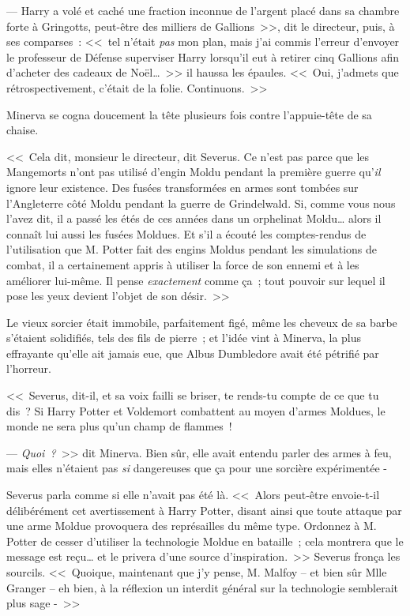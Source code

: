 --- Harry a volé et caché une fraction inconnue de l'argent placé dans sa chambre forte à Gringotts, peut-être des milliers de Gallions~>>, dit le directeur, puis, à ses comparses~: <<~tel n'était \emph{pas} mon plan, mais j'ai commis l'erreur d'envoyer le professeur de Défense superviser Harry lorsqu'il eut à retirer cinq Gallions afin d'acheter des cadeaux de Noël…~>> il haussa les épaules. <<~Oui, j'admets que rétrospectivement, c'était de la folie. Continuons.~>>

Minerva se cogna doucement la tête plusieurs fois contre l'appuie-tête de sa chaise.

<<~Cela dit, monsieur le directeur, dit Severus. Ce n'est pas parce que les Mangemorts n'ont pas utilisé d'engin Moldu pendant la première guerre qu'\emph{il} ignore leur existence. Des fusées transformées en armes sont tombées sur l'Angleterre côté Moldu pendant la guerre de Grindelwald. Si, comme vous nous l'avez dit, il a passé les étés de ces années dans un orphelinat Moldu… alors il connaît lui aussi les fusées Moldues. Et s'il a écouté les comptes-rendus de l'utilisation que M. Potter fait des engins Moldus pendant les simulations de combat, il a certainement appris à utiliser la force de son ennemi et à les améliorer lui-même. Il pense \emph{exactement} comme ça~; tout pouvoir sur lequel il pose les yeux devient l'objet de son désir.~>>

Le vieux sorcier était immobile, parfaitement figé, même les cheveux de sa barbe s'étaient solidifiés, tels des fils de pierre~; et l'idée vint à Minerva, la plus effrayante qu'elle ait jamais eue, que Albus Dumbledore avait été pétrifié par l'horreur.

<<~Severus, dit-il, et sa voix failli se briser, te rends-tu compte de ce que tu dis~? Si Harry Potter et Voldemort combattent au moyen d'armes Moldues, le monde ne sera plus qu'un champ de flammes~!

--- \emph{Quoi~?}~>> dit Minerva. Bien sûr, elle avait entendu parler des armes à feu, mais elles n'étaient pas \emph{si} dangereuses que ça pour une sorcière expérimentée -

Severus parla comme si elle n'avait pas été là. <<~Alors peut-être envoie-t-il délibérément cet avertissement à Harry Potter, disant ainsi que toute attaque par une arme Moldue provoquera des représailles du même type. Ordonnez à M. Potter de cesser d'utiliser la technologie Moldue en bataille~; cela montrera que le message est reçu… et le privera d'une source d'inspiration.~>> Severus fronça les sourcils. <<~Quoique, maintenant que j'y pense, M. Malfoy -- et bien sûr Mlle Granger -- eh bien, à la réflexion un interdit général sur la technologie semblerait plus sage -~>>

